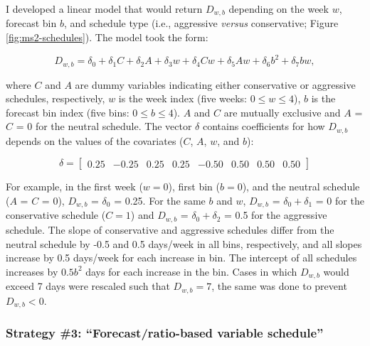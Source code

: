 \documentclass[12pt,]{book}
\theoremstyle{definition}
\theoremstyle{definition}
\theoremstyle{definition}
\theoremstyle{remark}
\begin{document}
\noindent
I developed a linear model that would return \(D_{w,b}\) depending on
the week \(w\), forecast bin \(b\), and schedule type (i.e., aggressive
\emph{versus} conservative; Figure \ref{fig:ms2-schedules}). The model
took the form:

\begin{equation}
  D_{w,b} = \delta_0 + \delta_1C + \delta_2A + \delta_3 w + \delta_4 Cw + \delta_5 Aw + \delta_6 b^2 + \delta_7 bw,
  \label{eq:gen-ms2-schedule}
\end{equation}

\noindent
where \(C\) and \(A\) are dummy variables indicating either conservative
or aggressive schedules, respectively, \(w\) is the week index (five
weeks: \(0 \le w \le 4\)), \(b\) is the forecast bin index (five bins:
\(0 \le b \le 4\)). \(A\) and \(C\) are mutually exclusive and \(A\) =
\(C\) = 0 for the neutral schedule. The vector \(\delta\) contains
coefficients for how \(D_{w,b}\) depends on the values of the covariates
(\(C\), \(A\), \(w\), and \(b\)):

\[
\delta=
  \begin{bmatrix}
    0.25&
    -0.25&
    0.25&
    0.25&
    -0.50&
    0.50&
    0.50&
    0.50
  \end{bmatrix}
\]

\noindent
For example, in the first week (\(w = 0\)), first bin (\(b = 0\)), and
the neutral schedule (\(A\) = \(C\) = 0), \(D_{w,b}\) = \(\delta_0\) =
0.25. For the same \(b\) and \(w\), \(D_{w,b}\) =
\(\delta_0 + \delta_1\) = 0 for the conservative schedule (\(C = 1\))
and \(D_{w,b}\) = \(\delta_0 + \delta_2\) = 0.5 for the aggressive
schedule. The slope of conservative and aggressive schedules differ from
the neutral schedule by -0.5 and 0.5 days/week in all bins,
respectively, and all slopes increase by 0.5 days/week for each increase
in bin. The intercept of all schedules increases by \(0.5b^2\) days for
each increase in the bin. Cases in which \(D_{w,b}\) would exceed 7 days
were rescaled such that \(D_{w,b} = 7\), the same was done to prevent
\(D_{w,b} < 0\).

\subsubsection{\texorpdfstring{Strategy \#3: ``Forecast/ratio-based
variable
schedule''}{Strategy \#3: Forecast/ratio-based variable schedule}}\label{strategy-3-forecastratio-based-variable-schedule}
\end{document}
